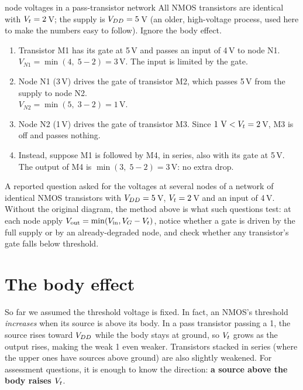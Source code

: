 \begin{worked}{node voltages in a pass-transistor network}
All NMOS transistors are identical with $V_{t} = 2$\,V; the supply is $V_{DD} = 5$\,V (an older, high-voltage process, used here to make the numbers easy to follow). Ignore the body effect.

\begin{enumerate}
  \item Transistor M1 has its gate at 5\,V and passes an input of 4\,V to node N1. \\
  $V_{N1} = \min(4,\; 5 - 2) = 3$\,V. The input is limited by the gate.
  \item Node N1 (3\,V) drives the gate of transistor M2, which passes 5\,V from the supply to node N2. \\
  $V_{N2} = \min(5,\; 3 - 2) = 1$\,V.
  \item Node N2 (1\,V) drives the gate of transistor M3. Since $1~\text{V} < V_{t} = 2$\,V, M3 is off and passes nothing.
  \item Instead, suppose M1 is followed by M4, in series, also with its gate at 5\,V. The output of M4 is $\min(3,\; 5-2) = 3$\,V: no extra drop.
\end{enumerate}
\end{worked}

\begin{onoa}
A reported question asked for the voltages at several nodes of a network of identical NMOS transistors with $V_{DD} = 5$\,V, $V_{t} = 2$\,V and an input of 4\,V. Without the original diagram, the method above is what such questions test: at each node apply $V_{\text{out}} = \min(V_{\text{in}}, V_G - V_{t})$, notice whether a gate is driven by the full supply or by an already-degraded node, and check whether any transistor's gate falls below threshold.
\end{onoa}

\section{The body effect}

So far we assumed the threshold voltage is fixed. In fact, an NMOS's threshold \emph{increases} when its source is above its body. In a pass transistor passing a 1, the source rises toward $V_{DD}$ while the body stays at ground, so $V_{t}$ grows as the output rises, making the weak 1 even weaker. Transistors stacked in series (where the upper ones have sources above ground) are also slightly weakened. For assessment questions, it is enough to know the direction: \textbf{a source above the body raises $V_{t}$}.

